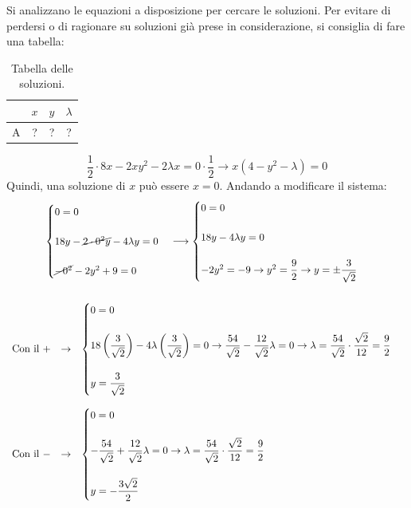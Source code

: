 \documentclass[a4paper]{article}
\begin{document}
	Si analizzano le equazioni a disposizione per cercare le soluzioni. Per evitare di perdersi o di ragionare su soluzioni già prese in considerazione, si consiglia di fare una tabella:
	\begin{table}[!htp]
		\centering
		\begin{tabular}{@{} l | c | c | c @{}}
			\toprule
			& $x$ & $y$ & $\lambda$\\
			\midrule
			A & ? & ? & ? \\
			\bottomrule
		\end{tabular}
		\caption*{Tabella delle soluzioni.}
	\end{table}\newpage

	\begin{equation*}
		\dfrac{1}{2} \cdot 8x - 2xy^{2} - 2\lambda x = 0 \cdot \dfrac{1}{2} \longrightarrow x\left(4 - y^{2} - \lambda\right) = 0
	\end{equation*}
	Quindi, una soluzione di $x$ può essere $x = 0$. Andando a modificare il sistema:
	\begin{gather*}
		\begin{cases}
			0 = 0 \\
			\\
			18y - \cancel{2 \cdot 0^{2} y} - 4\lambda y = 0 \\
			\\
			\cancel{-0^{2}} - 2y^{2} + 9 = 0
		\end{cases}
		\longrightarrow
		\begin{cases}
			0 = 0 \\
			\\
			18y - 4\lambda y = 0 \\
			\\
			- 2y^{2} = -9 \rightarrow y^{2} = \dfrac{9}{2} \rightarrow y = \pm \dfrac{3}{\sqrt{2}}
		\end{cases} \\
		\\
		\begin{array}{rcl}
			\text{Con il }+&\rightarrow&
			\begin{cases}
				0 = 0 \\
				\\
				18 \left(\dfrac{3}{\sqrt{2}}\right) - 4\lambda \left(\dfrac{3}{\sqrt{2}}\right) = 0 \rightarrow \dfrac{54}{\sqrt{2}} - \dfrac{12}{\sqrt{2}} \lambda = 0 \rightarrow \lambda = \dfrac{54}{\sqrt{2}} \cdot \dfrac{\sqrt{2}}{12}  = \dfrac{9}{2}\\
				\\
				y = \dfrac{3}{\sqrt{2}}
			\end{cases} \\
			\\
			\text{Con il }-&\rightarrow&
			\begin{cases}
				0 = 0 \\
				\\
				-\dfrac{54}{\sqrt{2}} + \dfrac{12}{\sqrt{2}} \lambda = 0 \rightarrow \lambda = \dfrac{54}{\sqrt{2}} \cdot \dfrac{\sqrt{2}}{12}  = \dfrac{9}{2}\\
				\\
				y = -\dfrac{3\sqrt{2}}{2}
			\end{cases}
		\end{array}
	\end{gather*}
\end{document}
